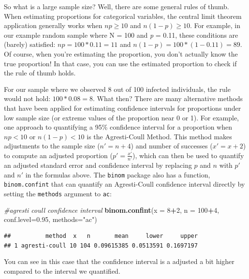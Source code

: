 \documentclass[
]{book}
\newenvironment{Shaded}{\begin{snugshade}}{\end{snugshade}}
\newcommand{\AttributeTok}[1]{\textcolor[rgb]{0.13,0.29,0.53}{#1}}
\newcommand{\CommentTok}[1]{\textcolor[rgb]{0.56,0.35,0.01}{\textit{#1}}}
\newcommand{\DecValTok}[1]{\textcolor[rgb]{0.00,0.00,0.81}{#1}}
\newcommand{\FloatTok}[1]{\textcolor[rgb]{0.00,0.00,0.81}{#1}}
\newcommand{\FunctionTok}[1]{\textcolor[rgb]{0.13,0.29,0.53}{\textbf{#1}}}
\newcommand{\NormalTok}[1]{#1}
\newcommand{\SpecialCharTok}[1]{\textcolor[rgb]{0.81,0.36,0.00}{\textbf{#1}}}
\newcommand{\StringTok}[1]{\textcolor[rgb]{0.31,0.60,0.02}{#1}}
\begin{document}
So what is a large sample size? Well, there are some general rules of thumb. When estimating proportions for categorical variables, the central limit theorem application generally works when \(np \geq 10\) and \(n(1-p) \geq 10\). For example, in our example random sample where N = 100 and \emph{p} = 0.11, these conditions are (barely) satisfied: \(np = 100*0.11 = 11\) and \(n(1-p) = 100*(1-0.11) = 89\). Of course, when you're estimating the proportion, you don't actually know the true proportion! In that case, you can use the estimated proportion to check if the rule of thumb holds.

For our sample where we observed 8 out of 100 infected individuals, the rule would not hold: \(100*0.08 = 8\). What then? There are many alternative methods that have been applied for estimating confidence intervals for proportions under low sample size (or extreme values of the proportion near 0 or 1). For example, one approach to quantifying a 95\% confidence interval for a proportion when \(np < 10\) or \(n(1-p) < 10\) is the Agresti-Coull Method. This method makes adjustments to the sample size (\(n'=n+4\)) and number of successes (\(x'=x+2\)) to compute an adjusted proportion (\(p'=\frac{x'}{n'}\)), which can then be used to quantify an adjusted standard error and confidence interval by replacing \(p\) and \(n\) with \(p'\) and \(n'\) in the formulas above. The \texttt{binom} package also has a function, \texttt{binom.confint} that can quantify an Agresti-Coull confidence interval directly by setting the \texttt{methods} argument to \texttt{ac}:

\begin{Shaded}
\begin{Highlighting}[]
\CommentTok{\#agresti coull confidence interval}
\FunctionTok{binom.confint}\NormalTok{(}\AttributeTok{x =} \DecValTok{8}\SpecialCharTok{+}\DecValTok{2}\NormalTok{, }\AttributeTok{n =} \DecValTok{100}\SpecialCharTok{+}\DecValTok{4}\NormalTok{, }\AttributeTok{conf.level=}\FloatTok{0.95}\NormalTok{, }\AttributeTok{methods=}\StringTok{"ac"}\NormalTok{)}
\end{Highlighting}
\end{Shaded}

\begin{verbatim}
##          method  x   n       mean     lower     upper
## 1 agresti-coull 10 104 0.09615385 0.0513591 0.1697197
\end{verbatim}

You can see in this case that the confidence interval is a adjusted a bit higher compared to the interval we quantified.
\end{document}
